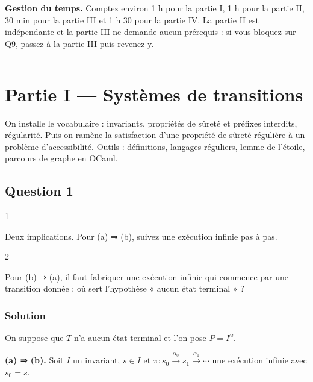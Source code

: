 \documentclass[11pt,a4paper]{article}
\begin{document}
\textbf{Gestion du temps.} Comptez environ 1 h pour la partie I, 1 h pour la partie II, 30 min pour la partie III et 1 h 30 pour la partie IV. La partie II est indépendante et la partie III ne demande aucun prérequis : si vous bloquez sur Q9, passez à la partie III puis revenez-y.

\begin{center}\rule{0.5\linewidth}{0.5pt}\end{center}

\hypertarget{partie-i-systuxe8mes-de-transitions}{%
\section{Partie I --- Systèmes de transitions}\label{partie-i-systuxe8mes-de-transitions}}

On installe le vocabulaire : invariants, propriétés de sûreté et préfixes interdits, régularité. Puis on ramène la satisfaction d'une propriété de sûreté régulière à un problème d'accessibilité. Outils : définitions, langages réguliers, lemme de l'étoile, parcours de graphe en OCaml.

\hypertarget{question-1}{%
\subsection{Question 1}\label{question-1}}

\begin{indication}{1}

Deux implications. Pour (a) ⇒ (b), suivez une exécution infinie pas à pas.

\end{indication}

\begin{indication}{2}

Pour (b) ⇒ (a), il faut fabriquer une exécution infinie qui commence par une transition donnée : où sert l'hypothèse « aucun état terminal » ?

\end{indication}

\hypertarget{solution}{%
\subsubsection{Solution}\label{solution}}

On suppose que \(T\) n'a aucun état terminal et l'on pose \(P=I^\omega\).

\textbf{(a) ⇒ (b).} Soit \(I\) un invariant, \(s\in I\) et \(\pi:s_0\xrightarrow{\alpha_0}s_1\xrightarrow{\alpha_1}\cdots\) une exécution infinie avec \(s_0=s\).
\end{document}
